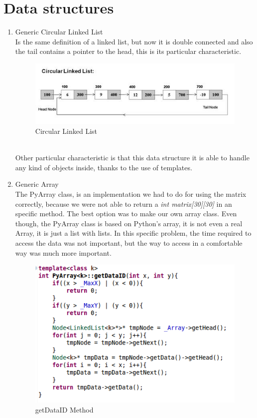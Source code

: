 \documentclass[twocolumn]{IEEEtran}
\begin{document}
\section{Data structures}

	\begin{enumerate}
		\item Generic Circular Linked List\\
        
        Is the same definition of a linked list, but now it is double connected and also the 
        tail contains a pointer to the head, this is its particular characteristic.
     	   \begin{figure}[h!]
				\centering
				\includegraphics[width=\columnwidth]{src/circularLinkedList.jpg}
				\caption{Circular Linked List}
			\end{figure}\\
		Other particular characteristic is that this data structure it is able to handle any 
        kind of objects inside, thanks to the use of templates.\\
        
        \item Generic Array\\
        The PyArray class, is an implementation we had to do for using the matrix correctly, because we were not able to return a \textit{int matrix[30][30]} in an specific method. The best option was to make our own array class. Even though, the PyArray class is based on Python's array, it is not even a real Array, it is just a list with lists. In this specific problem, the time required to access the data was not important, but the way to access in a comfortable way was much more important.
        \begin{figure}[h!]
				\centering
				\includegraphics[width=\columnwidth]{src/getDataID.png}
				\caption{getDataID Method}
			\end{figure}\\
            

\end{enumerate}
\end{document}
